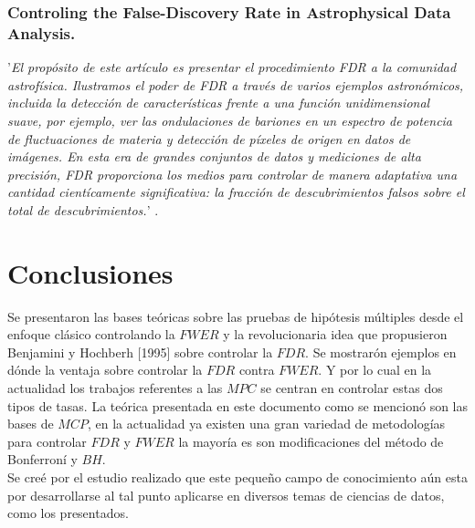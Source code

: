 \documentclass[11pt,letterpaper]{article}
\begin{document}
\subsubsection{Controling the False-Discovery Rate in Astrophysical Data Analysis.} 

'\textit{El propósito de este artículo es presentar el procedimiento FDR a la comunidad astrofísica. Ilustramos el poder de FDR a través de varios ejemplos astronómicos, incluida la detección de características frente a una función unidimensional suave, por ejemplo, ver las \textit{ondulaciones de bariones} en un espectro de potencia de fluctuaciones de materia y detección de píxeles de origen en datos de imágenes. En esta era de grandes conjuntos de datos y mediciones de alta precisión, FDR proporciona los medios para controlar de manera adaptativa una cantidad cientícamente significativa: la fracción de descubrimientos falsos sobre el total de descubrimientos.}' \cite{Miller_2001}.

\section{Conclusiones}
Se presentaron las bases teóricas sobre las pruebas de hipótesis múltiples desde el enfoque clásico controlando la $FWER$ y la revolucionaria idea que propusieron Benjamini y Hochberh [1995] sobre controlar la $FDR$. Se mostrarón ejemplos en dónde la ventaja sobre controlar la $FDR$ contra $FWER$. Y por lo cual en la actualidad los trabajos referentes a las $MPC$ se centran en controlar estas dos tipos de tasas. La teórica presentada en este documento como se mencionó son las bases de $MCP$, en la actualidad ya existen una gran variedad de metodologías para controlar $FDR$ y $FWER$ la mayoría es son modificaciones del método de Bonferroní y $BH$.\\

Se creé por el estudio realizado que este pequeño campo de conocimiento aún esta por desarrollarse al tal punto aplicarse en diversos temas de ciencias de datos, como los presentados.
\end{document}
